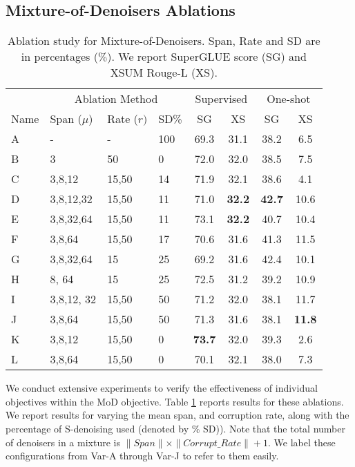 \documentclass[10pt]{article}
\begin{document}
\subsection{Mixture-of-Denoisers Ablations}
\begin{table}[t]
    \centering
    \small
      \caption{Ablation study for Mixture-of-Denoisers. Span, Rate and SD are in percentages ($\%$). We report SuperGLUE score (SG) and XSUM Rouge-L (XS).}
    \label{tab:denoiser_ablation}\begin{tabular}{llllcccc}
    \toprule
       & \multicolumn{3}{c}{Ablation Method} & \multicolumn{2}{c}{Supervised}  &  \multicolumn{2}{c}{One-shot}  \\
        Name & Span ($\mu$) & Rate ($r)$ & SD\% & SG & XS & SG & XS \\
        \midrule
       A &  - & - & 100  & 69.3 & 31.1 & 38.2 & 6.5\\
        B & 3 & 50 & 0  &72.0 & 32.0 & 38.5 & 7.5\\
        \midrule
C &   3,8,12 & 15,50    & 14 & 71.9 & 32.1 & 38.6 & 4.1\\
 D &3,8,12,32 & 15,50 &  11 &71.0 & \textbf{32.2} & \textbf{42.7} & 10.6\\
 E & 3,8,32,64 & 15,50 & 11 &  73.1 & \textbf{32.2} & 40.7 & 10.4\\
 F & 3,8,64 & 15,50 & 17 & 70.6 & 31.6 & 41.3 & 11.5 \\
 G & 3,8,32,64 & 15 & 25 & 69.2 & 31.6 & 42.4 & 10.1\\ 
 H  & 8, 64 & 15 & 25 & 72.5 & 31.2 & 39.2 & 10.9 \\
  I & 3,8,12, 32 & 15,50 & 50 & 71.2 &32.0 & 38.1 & 11.7\\
  J & 3,8,64 & 15,50 & 50 & 71.3  &31.6 & 38.1& \textbf{11.8}\\
  K & 3,8,12 & 15,50 & 0 & \textbf{73.7}  & 32.0& 39.3 & 2.6\\
  L & 3,8,64 & 15,50 & 0 & 70.1 & 32.1& 38.0& 7.3\\
         \bottomrule
    \end{tabular}
  
\end{table}
We conduct extensive experiments to verify the effectiveness of individual objectives within the MoD objective. Table \ref{tab:denoiser_ablation} reports results for these ablations. We report results for varying the mean span, and corruption rate, along with the percentage of S-denoising used (denoted by \% SD)). Note that the total number of denoisers in a mixture is $\|Span\| \times \|Corrupt\_Rate\| + 1$. 
We label these configurations from Var-A through Var-J to refer to them easily. 
\end{document}
